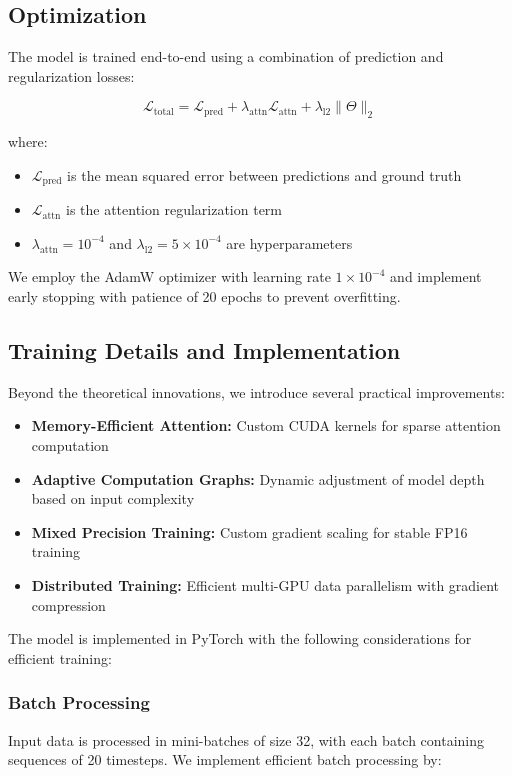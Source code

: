 \documentclass[lettersize, journal]{IEEEtran}
\begin{document}
\subsection{Optimization}
The model is trained end-to-end using a combination of prediction and regularization losses:

\begin{equation}
\mathcal{L}_{\text{total}} = \mathcal{L}_{\text{pred}} + \lambda_{\text{attn}}\mathcal{L}_{\text{attn}} + \lambda_{\text{l2}}\|\Theta\|_2
\end{equation}

where:
\begin{itemize}
    \item $\mathcal{L}_{\text{pred}}$ is the mean squared error between predictions and ground truth
    \item $\mathcal{L}_{\text{attn}}$ is the attention regularization term
    \item $\lambda_{\text{attn}} = 10^{-4}$ and $\lambda_{\text{l2}} = 5 \times 10^{-4}$ are hyperparameters
\end{itemize}

We employ the AdamW optimizer with learning rate $1 \times 10^{-4}$ and implement early stopping with patience of 20 epochs to prevent overfitting.

\subsection{Training Details and Implementation}
Beyond the theoretical innovations, we introduce several practical improvements:

\begin{itemize}
    \item \textbf{Memory-Efficient Attention:} Custom CUDA kernels for sparse attention computation
    \item \textbf{Adaptive Computation Graphs:} Dynamic adjustment of model depth based on input complexity
    \item \textbf{Mixed Precision Training:} Custom gradient scaling for stable FP16 training
    \item \textbf{Distributed Training:} Efficient multi-GPU data parallelism with gradient compression
\end{itemize}

The model is implemented in PyTorch with the following considerations for efficient training:

\subsubsection{Batch Processing}
Input data is processed in mini-batches of size 32, with each batch containing sequences of 20 timesteps. We implement efficient batch processing by:
\end{document}
